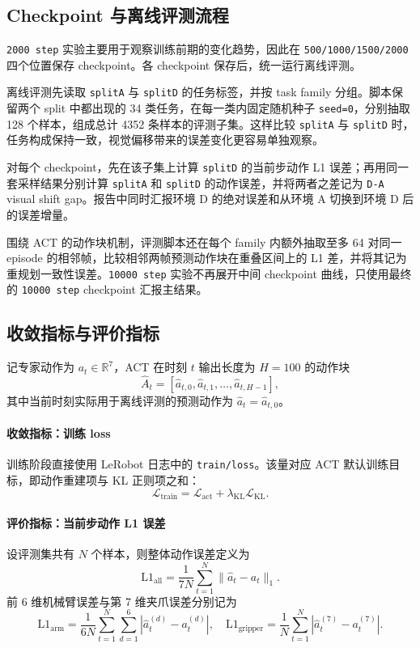 \documentclass{article}
\begin{document}
\subsection{Checkpoint 与离线评测流程}

\texttt{2000 step} 实验主要用于观察训练前期的变化趋势，因此在 \texttt{500/1000/1500/2000} 四个位置保存 checkpoint。各 checkpoint 保存后，统一运行离线评测。

离线评测先读取 \texttt{splitA} 与 \texttt{splitD} 的任务标签，并按 task family 分组。脚本保留两个 split 中都出现的 34 类任务，在每一类内固定随机种子 \texttt{seed=0}，分别抽取 128 个样本，组成总计 4352 条样本的评测子集。这样比较 \texttt{splitA} 与 \texttt{splitD} 时，任务构成保持一致，视觉偏移带来的误差变化更容易单独观察。

对每个 checkpoint，先在该子集上计算 \texttt{splitD} 的当前步动作 L1 误差；再用同一套采样结果分别计算 \texttt{splitA} 和 \texttt{splitD} 的动作误差，并将两者之差记为 \texttt{D-A} visual shift gap。报告中同时汇报环境 D 的绝对误差和从环境 A 切换到环境 D 后的误差增量。

围绕 ACT 的动作块机制，评测脚本还在每个 family 内额外抽取至多 64 对同一 episode 的相邻帧，比较相邻两帧预测动作块在重叠区间上的 L1 差，并将其记为重规划一致性误差。\texttt{10000 step} 实验不再展开中间 checkpoint 曲线，只使用最终的 \texttt{10000 step} checkpoint 汇报主结果。

\subsection{收敛指标与评价指标}

记专家动作为 $a_t \in \mathbb{R}^7$，ACT 在时刻 $t$ 输出长度为 $H=100$ 的动作块
\[
\hat{A}_t = [\hat{a}_{t,0}, \hat{a}_{t,1}, \ldots, \hat{a}_{t,H-1}],
\]
其中当前时刻实际用于离线评测的预测动作为 $\hat{a}_t=\hat{a}_{t,0}$。

\paragraph{收敛指标：训练 loss}
训练阶段直接使用 LeRobot 日志中的 \texttt{train/loss}。该量对应 ACT 默认训练目标，即动作重建项与 KL 正则项之和：
\[
\mathcal{L}_{\text{train}}=\mathcal{L}_{\text{act}}+\lambda_{\text{KL}}\mathcal{L}_{\text{KL}}.
\]

\paragraph{评价指标：当前步动作 L1 误差}
设评测集共有 $N$ 个样本，则整体动作误差定义为
\[
\mathrm{L1}_{\text{all}}=\frac{1}{7N}\sum_{t=1}^{N}\|\hat{a}_t-a_t\|_1.
\]
前 6 维机械臂误差与第 7 维夹爪误差分别记为
\[
\mathrm{L1}_{\text{arm}}=\frac{1}{6N}\sum_{t=1}^{N}\sum_{d=1}^{6}\left|\hat{a}_t^{(d)}-a_t^{(d)}\right|,
\quad
\mathrm{L1}_{\text{gripper}}=\frac{1}{N}\sum_{t=1}^{N}\left|\hat{a}_t^{(7)}-a_t^{(7)}\right|.
\]
\end{document}
